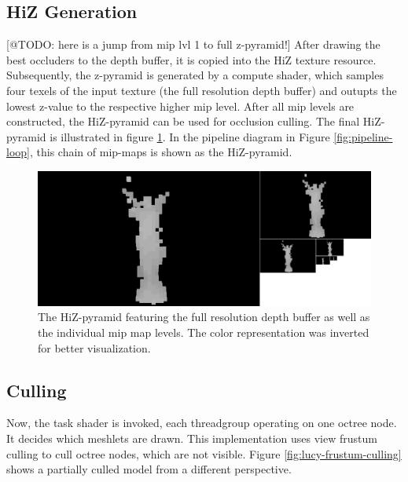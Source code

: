 \subsection*{HiZ Generation} \label{subsec-highz-generation}

[@TODO: here is a jump from mip lvl 1 to full z-pyramid!]
After drawing the best occluders to the depth buffer, it is copied into the \ac{HiZ} texture resource. Subsequently, 
the z-pyramid is generated by a compute shader, which samples four texels of the input texture (the full resolution 
depth buffer) and outupts the lowest z-value to the respective higher mip level. After all mip levels are constructed, 
the \ac{HiZ}-pyramid can be used for occlusion culling. The final \ac{HiZ}-pyramid is illustrated in figure 
\ref{fig:lucy-hiz-pyramid}. In the pipeline diagram in Figure \ref{fig:pipeline-loop}, this chain of mip-maps is shown 
as the \ac{HiZ}-pyramid.

\begin{figure}[h]
    \centering
    \includegraphics[width=\linewidth]{images/graphics/lucy-hiz-pyramid-inverted.jpg}
    \caption{The \ac{HiZ}-pyramid featuring the full resolution depth buffer as well as the individual mip map 
    levels. The color representation was inverted for better visualization.}
    \label{fig:lucy-hiz-pyramid}
\end{figure}


\subsection*{Culling} \label{subsec-task-shader}

Now, the task shader is invoked, each threadgroup operating on one octree node. It decides which 
meshlets are drawn. This implementation uses view frustum culling to cull octree nodes, which are 
not visible. Figure \ref{fig:lucy-frustum-culling} shows a partially culled model from a different 
perspective. 


